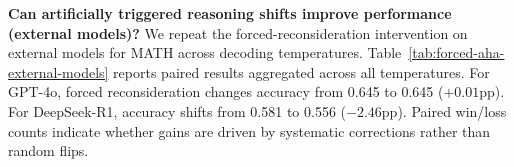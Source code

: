 \noindent
\textbf{Can artificially triggered reasoning shifts improve performance (external models)?}
We repeat the forced-reconsideration intervention on external models for \textsc{MATH} across decoding temperatures. Table~\ref{tab:forced-aha-external-models} reports paired results aggregated across all temperatures. For GPT-4o, forced reconsideration changes accuracy from 0.645 to 0.645 ($+0.01$pp). For DeepSeek-R1, accuracy shifts from 0.581 to 0.556 ($-2.46$pp). Paired win/loss counts indicate whether gains are driven by systematic corrections rather than random flips.

